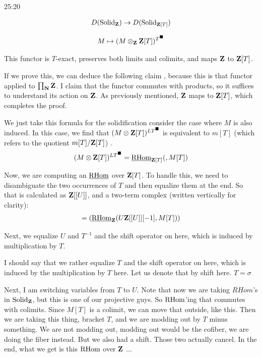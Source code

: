 \begin{unfinished}{25:20}
\begin{claim}

\begin{align*}
D(\mathrm{Solid}_\mathbf Z) \to D(\mathrm{Solid}_{\mathbf Z[T]})
\end{align*}

\begin{align*}
M \mapsto (M \otimes_\mathbf Z \mathbf Z[T])^{T^\blacksquare}
\end{align*}

\end{claim}

This functor is $T$-exact, preserves both limits and colimits, and maps $\mathbf Z$ to $\mathbf Z[T]$.

If we prove this, we can deduce the following claim , because this is that functor applied to $\prod_\mathbf N \mathbf Z$. 
I claim that the functor commutes with products, so it suffices to understand its action on $\mathbf Z$. As previously mentioned, $\mathbf Z$ maps to $\mathbf Z[T]$, which completes the proof.

\begin{sketch}
We just take this formula for the solidification consider the case where $M$ is also induced. In this case, we find that $(M \otimes \mathbf Z[T])^{LT^\blacksquare}$ is equivalent to $m [T]$ (which refers to the quotient $m[T]/\mathbf Z[T]$) . 
\begin{align*}
(M \otimes \mathbf Z[T])^{LT^\blacksquare} = \operatorname{\underline{RHom}}_{\mathbf Z[T]} ( , M[T])
\end{align*}

Now, we are computing an $\operatorname{\underline{RHom}}$ over $\mathbf Z[T]$. To handle this, we need to disambiguate the two occurrences of $T$ and then equalize them at the end. So that is calculated as $\mathbf Z[[U]]$, and a two-term complex (written vertically for clarity): 
\begin{align*}
= (\operatorname{\underline{RHom}}_\mathbf Z ( U \mathbf Z[[U]] [-1], M[T]) )
\end{align*}

Next, we equalize $U$ and $T^{-1}$ and the shift operator on here, which is induced by multiplication by $T$.

I should say that we rather equalize $T$ and the shift operator on here, which is induced by the multiplication by $T$ here. Let us denote that by shift here. $T = \sigma$

Next, I am switching variables from $T$ to $U$.
Note that now we are taking $RHom$'s in $\mathrm{Solid}_\mathbf Z$, but this is one of our projective guys. So $\operatorname{RHom}$'ing that commutes with colimits. Since $M[T]$ is a colimit, we can move that  outside, like this.
Then we are taking this thing, bracket $T$, and we are modding out by $T$ minus something. We are not modding out, modding out would be the cofiber, we are doing the fiber instead. But we also had a shift. Those two actually cancel. In the end, what we get is this $\operatorname{RHom}$ over $\mathbf Z$ ...


\end{sketch}
\end{unfinished}
